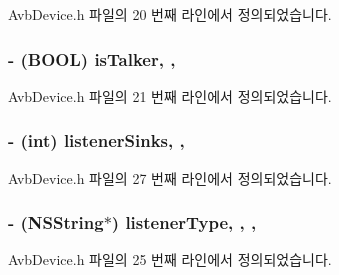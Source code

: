Avb\+Device.\+h 파일의 20 번째 라인에서 정의되었습니다.

\subsubsection[{\texorpdfstring{is\+Talker}{isTalker}}]{\setlength{\rightskip}{0pt plus 5cm}-\/ (B\+O\+OL) is\+Talker\hspace{0.3cm}{\ttfamily [read]}, {\ttfamily [write]}, {\ttfamily [atomic]}}\hypertarget{interface_avb_device_a0c9b72b73cb3178fd1b37ca16f2e05d6}{}\label{interface_avb_device_a0c9b72b73cb3178fd1b37ca16f2e05d6}


Avb\+Device.\+h 파일의 21 번째 라인에서 정의되었습니다.

\subsubsection[{\texorpdfstring{listener\+Sinks}{listenerSinks}}]{\setlength{\rightskip}{0pt plus 5cm}-\/ (int) listener\+Sinks\hspace{0.3cm}{\ttfamily [read]}, {\ttfamily [write]}, {\ttfamily [atomic]}}\hypertarget{interface_avb_device_a51467b97f68b29de0f35ec25ac7a1882}{}\label{interface_avb_device_a51467b97f68b29de0f35ec25ac7a1882}


Avb\+Device.\+h 파일의 27 번째 라인에서 정의되었습니다.

\subsubsection[{\texorpdfstring{listener\+Type}{listenerType}}]{\setlength{\rightskip}{0pt plus 5cm}-\/ (N\+S\+String$\ast$) listener\+Type\hspace{0.3cm}{\ttfamily [read]}, {\ttfamily [write]}, {\ttfamily [atomic]}, {\ttfamily [copy]}}\hypertarget{interface_avb_device_a37c791219c5f1629f5675ba02a9f35d5}{}\label{interface_avb_device_a37c791219c5f1629f5675ba02a9f35d5}


Avb\+Device.\+h 파일의 25 번째 라인에서 정의되었습니다.

